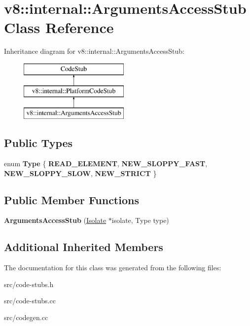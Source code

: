 \hypertarget{classv8_1_1internal_1_1_arguments_access_stub}{}\section{v8\+:\+:internal\+:\+:Arguments\+Access\+Stub Class Reference}
\label{classv8_1_1internal_1_1_arguments_access_stub}
Inheritance diagram for v8\+:\+:internal\+:\+:Arguments\+Access\+Stub\+:\begin{figure}[H]
\begin{center}
\leavevmode
\includegraphics[height=3.000000cm]{classv8_1_1internal_1_1_arguments_access_stub}
\end{center}
\end{figure}
\subsection*{Public Types}
\begin{DoxyCompactItemize}
\item 
\hypertarget{classv8_1_1internal_1_1_arguments_access_stub_a5b0ef2969a63a5eba537d5d0955686ee}{}enum {\bfseries Type} \{ {\bfseries R\+E\+A\+D\+\_\+\+E\+L\+E\+M\+E\+N\+T}, 
{\bfseries N\+E\+W\+\_\+\+S\+L\+O\+P\+P\+Y\+\_\+\+F\+A\+S\+T}, 
{\bfseries N\+E\+W\+\_\+\+S\+L\+O\+P\+P\+Y\+\_\+\+S\+L\+O\+W}, 
{\bfseries N\+E\+W\+\_\+\+S\+T\+R\+I\+C\+T}
 \}\label{classv8_1_1internal_1_1_arguments_access_stub_a5b0ef2969a63a5eba537d5d0955686ee}

\end{DoxyCompactItemize}
\subsection*{Public Member Functions}
\begin{DoxyCompactItemize}
\item 
\hypertarget{classv8_1_1internal_1_1_arguments_access_stub_ac83e90029dbc7049ef495f847d6198b2}{}{\bfseries Arguments\+Access\+Stub} (\hyperlink{classv8_1_1internal_1_1_isolate}{Isolate} $\ast$isolate, Type type)\label{classv8_1_1internal_1_1_arguments_access_stub_ac83e90029dbc7049ef495f847d6198b2}

\end{DoxyCompactItemize}
\subsection*{Additional Inherited Members}


The documentation for this class was generated from the following files\+:\begin{DoxyCompactItemize}
\item 
src/code-\/stubs.\+h\item 
src/code-\/stubs.\+cc\item 
src/codegen.\+cc\end{DoxyCompactItemize}
